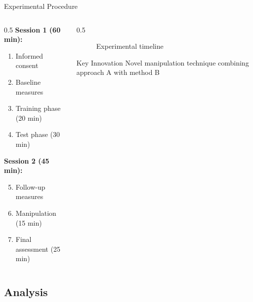 \documentclass[aspectratio=169,11pt]{beamer}
\begin{document}
\begin{frame}{Experimental Procedure}
  \begin{columns}[T]
    
    \begin{column}{0.5\textwidth}
      \textbf{Session 1 (60 min):}
      \begin{enumerate}
        \item Informed consent
        \item Baseline measures
        \item Training phase (20 min)
        \item Test phase (30 min)
      \end{enumerate}
      
      \vspace{0.5cm}
      
      \textbf{Session 2 (45 min):}
      \begin{enumerate}
        \setcounter{enumi}{4}
        \item Follow-up measures
        \item Manipulation (15 min)
        \item Final assessment (25 min)
      \end{enumerate}
    \end{column}
    
    \begin{column}{0.5\textwidth}
      \begin{figure}
        \centering
        \caption{Experimental timeline}
      \end{figure}
      
      \vspace{0.5cm}
      
      \begin{alertblock}{Key Innovation}
        Novel manipulation technique combining approach A with method B
      \end{alertblock}
    \end{column}
    
  \end{columns}
\end{frame}

\subsection{Analysis}
\end{document}
